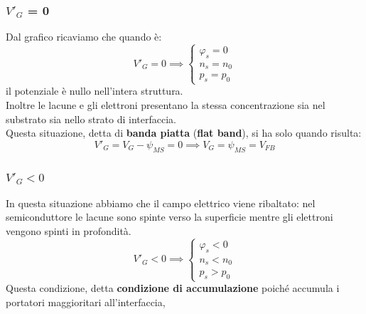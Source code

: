 \documentclass[../main.tex]{subfiles}
\begin{document}
	\subsubsection{$V'_G$ = 0}
	Dal grafico ricaviamo che quando è:
	$$V'_G = 0 \implies \begin{cases} \varphi_s = 0 \\ n_s = n_0 \\ p_s = p_0 \end{cases}$$
	il potenziale è nullo nell’intera struttura.\\
	Inoltre le lacune e gli elettroni presentano la stessa concentrazione sia nel substrato sia nello strato di interfaccia.\\
	Questa situazione, detta di \textbf{banda piatta} (\textbf{flat band}), si ha solo quando risulta:
	$$V'_G = V_G - \psi_{MS} = 0 \implies V_G = \psi_{MS} = V_{FB}$$
	\subsubsection{$V'_G < 0$}
	In questa situazione abbiamo che il campo elettrico viene ribaltato: nel semiconduttore le lacune sono spinte verso la superficie mentre gli elettroni vengono spinti in profondità.
	$$V'_G < 0 \implies \begin{cases} \varphi_s < 0 \\ n_s < n_0 \\ p_s > p_0 \end{cases}$$
	Questa condizione, detta \textbf{condizione di accumulazione} poiché accumula i portatori maggioritari all’interfaccia,
\end{document}

